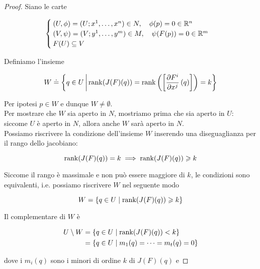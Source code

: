\begin{proof}
	Siano le carte
	
	\begin{equation}
		\begin{cases}
			(U,\phi) = (U; x^{1},\dots,x^{n}) \in N \qcomma \phi(p) = 0 \in \R^{n} \\
			(V,\psi) = (V; y^{1},\dots,y^{m}) \in M \qcomma \psi(F(p)) = 0  \in \R^{m} \\
			F(U) \subseteq V
		\end{cases}
	\end{equation}

	Definiamo l'insieme
	
	\begin{equation}
		W \doteq \left\{ q \in U \, \middle| \, \rank(J(F)(q)) = \rank \left( \left[ \pdv{F^{i}}{x^{j}} \, (q) \right] \right) = k \right\}
	\end{equation}

	Per ipotesi $ p \in W $ e dunque $ W \neq \emptyset $.\\
	Per mostrare che $ W $ sia aperto in $ N $, mostriamo prima che sia aperto in $ U $: siccome $ U $ è aperto in $ N $, allora anche $ W $ sarà aperto in $ N $.\\
	Possiamo riscrivere la condizione dell'insieme $ W $ inserendo una diseguaglianza per il rango dello jacobiano:
	
	\begin{equation}
		\rank(J(F)(q)) = k %
		\implies %
		\rank(J(F)(q)) \geqslant k
	\end{equation}

	Siccome il rango è massimale e non può essere maggiore di $ k $, le condizioni sono equivalenti, i.e. possiamo riscrivere $ W $ nel seguente modo
	
	\begin{equation}
		W = \{ q \in U \mid \rank(J(F)(q)) \geqslant k \}
	\end{equation}

	Il complementare di $ W $ è
	
	\begin{align}
		\begin{split}
			U \setminus W &= \{ q \in U \mid \rank(J(F)(q)) < k \} \\
			&= \{ q \in U \mid m_{1}(q) = \cdots = m_{t}(q) = 0 \}
		\end{split}
	\end{align}

	dove i $ m_{i}(q) $ sono i minori di ordine $ k $ di $ J(F)(q) $ e
	

\end{proof}
